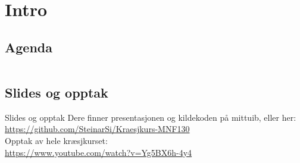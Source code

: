 \begin{frame}[t,plain]
    \titlepage
\end{frame}

\section*{Intro}
\subsection*{Agenda}
\begin{frame}
    \begin{columns}[t]
        \begin{column}{.5\textwidth}
            \tableofcontents[sections={1-4}]
        \end{column}
        \begin{column}{.5\textwidth}
            \tableofcontents[sections={5-}]
        \end{column}
    \end{columns}
\end{frame}

\subsection*{Slides og opptak}
\begin{frame}{Slides og opptak}
    Dere finner presentasjonen og kildekoden på mittuib, eller her:\\
    \url{https://github.com/SteinarSi/Kraesjkurs-MNF130}\\

    Opptak av hele kræsjkurset:\\
    \url{https://www.youtube.com/watch?v=Yg5BX6h-4y4}
\end{frame}